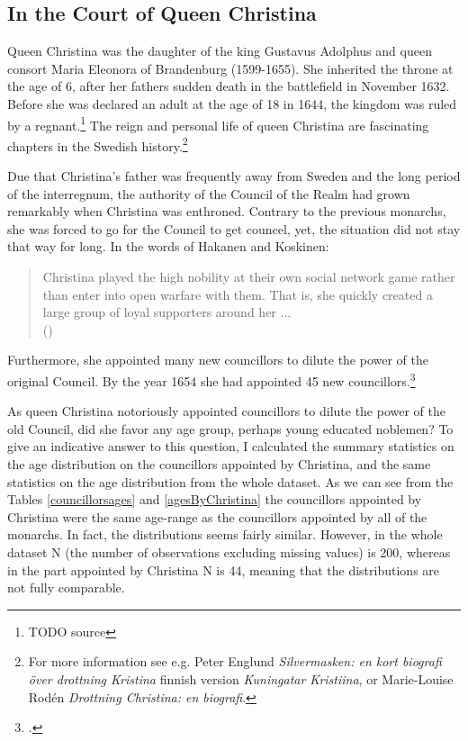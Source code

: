 \subsection{In the Court of Queen Christina}
\label{christina}
Queen Christina was the daughter of the king Gustavus Adolphus and queen consort Maria Eleonora of Brandenburg (1599-1655). She inherited the throne at the age of 6, after her fathers sudden death in the battlefield in November 1632. Before she was declared an adult at the age of 18 in 1644, the kingdom was ruled by a regnant.\footnote{TODO source} The reign and personal life of queen Christina are fascinating chapters in the Swedish history.\footnote{For more information see e.g. Peter Englund \textit{Silvermasken: en kort biografi över drottning Kristina} finnish version \textit{Kuningatar Kristiina}, or Marie-Louise Rodén \textit{Drottning Christina: en biografi}.}

Due that Christina's father was frequently away from Sweden and the long period of the interregnum, the authority of the Council of the Realm had grown remarkably when Christina was enthroned. Contrary to the previous monarchs, she was forced to go for the Council to get councel, yet, the situation did not stay that way for long. In the words of Hakanen and Koskinen: 

\begin{quote}
	Christina played the high nobility at their own social network game rather than enter into open warfare with them. That is, she quickly created a large group of loyal supporters around her $\dots$\\
	(\cite[p. 64]{HakanenAKoskinen2017})
\end{quote}

Furthermore, she appointed many new councillors to dilute the power of the original Council. By the year 1654 she had appointed 45 new councillors.\footcite[p. 64.]{HakanenAKoskinen2017}

As queen Christina notoriously appointed councillors to dilute the power of the old Council, did she favor any age group, perhaps young educated noblemen? To give an indicative answer to this question, I calculated the summary statistics on the age distribution on the councillors appointed by Christina, and the same statistics on the age distribution from the whole dataset. As we can see from the Tables \ref{councillorsages} and \ref{agesByChristina} the councillors appointed by Christina were the same age-range as the councillors appointed by all of the monarchs. In fact, the distributions seems fairly similar. However, in the whole dataset N (the number of observations excluding missing values) is 200, whereas in the part appointed by Christina N is 44, meaning that the distributions are not fully comparable.

